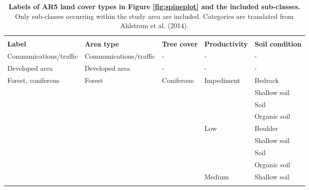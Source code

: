 \documentclass{article}
\begin{document}
\newpage
\begin{longtable}{ p{4cm} | p{4cm} l l l} 
\caption{\textbf{Labels of AR5 land cover types in Figure \ref{fig:spineplot} and the included sub-classes.} Only sub-classes occurring within the study area are included. Categories are translated from Ahlstrøm et al. (2014).}\\
\label{table:AR5_classes}\\
\textbf{Label}          &   \textbf{Area type}      &   \textbf{Tree cover}     &       \textbf{Productivity}       &       \textbf{Soil condition} \\
\hline
Communications/traffic  &   Communications/traffic  & -                         &       -                           &       -                  \\
\hline
Developed area          & Developed area            & -                         &       -                           &       -                  \\
\hline
\multirow{15}{*}{Forest, coniferous} & \multirow{15}{*}{Forest} & \multirow{15}{*}{Coniferous} & \multirow{4}{*}{Impediment} & Bedrock \\   \cline{5-5}
                        &                           &                           &                                   &       Shallow soil \\ \cline{5-5}
                        &                           &                           &                                   &       Soil \\         \cline{5-5}
                        &                           &                           &                                   &       Organic soil \\ \cline{5-5}
\cline{4-5}
                        &                           &                           &       \multirow{4}{*}{Low}        &       Boulder \\      \cline{5-5}
                        &                           &                           &                                   &       Shallow soil \\ \cline{5-5}
                        &                           &                           &                                   &       Soil \\         \cline{5-5}
                        &                           &                           &                                   &       Organic soil \\ \cline{5-5}
\cline{4-5}
                        &                           &                           &       \multirow{3}{*}{Medium}     &       Shallow soil \\ \cline{5-5}

\end{longtable}
\end{document}
